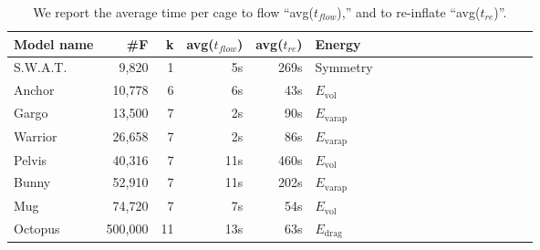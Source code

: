 \begin{table}
\centering
{}
\setlength{\tabcolsep}{5.5pt}
\begin{tabular}{l r r r r l r r r r r r r r r r r r}
\rowcolor{white}
Model name  & \#F & k & avg($t_{flow}$) & avg($t_{re}$) & Energy\\
\midrule
S.W.A.T. & 9,820 & 1 & 5s & 269s & Symmetry \\
Anchor & 10,778 & 6 & 6s & 43s & $E_\text{vol}$ \\
Gargo & 13,500 & 7 & 2s & 90s & $E_\text{varap}$\\
Warrior & 26,658 & 7 & 2s & 86s & $E_\text{varap}$  \\
Pelvis & 40,316 & 7 & 11s & 460s & $E_\text{vol}$  \\
Bunny & 52,910 & 7 & 11s & 202s & $E_\text{varap}$ \\
Mug & 74,720 & 7 & 7s & 54s & $E_\text{vol}$ \\
Octopus & 500,000 & 11 & 13s & 63s & $E_\text{drag}$ \\
\bottomrule
\end{tabular}
\caption{
We report the average time per cage to flow ``avg($t_{flow}$),'' and to
re-inflate ``avg($t_{re}$)''.
}
\label{tab:timings}
\end{table}
